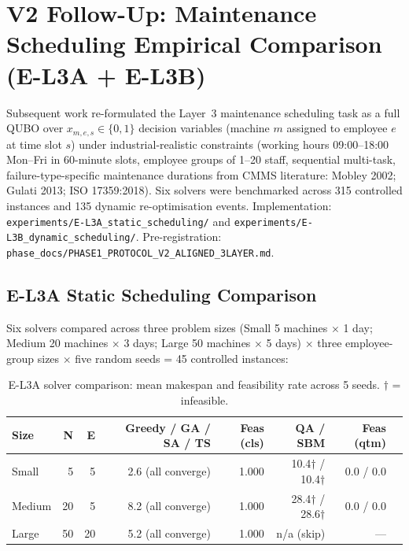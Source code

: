 \section{V2 Follow-Up: Maintenance Scheduling Empirical Comparison (E-L3A + E-L3B)}
\label{sec:v2_scheduling_followup}

Subsequent work re-formulated the Layer~3 maintenance scheduling task as a full QUBO over $x_{m,e,s} \in \{0,1\}$ decision variables (machine $m$ assigned to employee $e$ at time slot $s$) under industrial-realistic constraints (working hours 09:00--18:00 Mon--Fri in 60-minute slots, employee groups of 1--20 staff, sequential multi-task, failure-type-specific maintenance durations from CMMS literature: Mobley 2002; Gulati 2013; ISO 17359:2018). Six solvers were benchmarked across 315 controlled instances and 135 dynamic re-optimisation events. Implementation: \texttt{experiments/E-L3A\_static\_scheduling/} and \texttt{experiments/E-L3B\_dynamic\_scheduling/}. Pre-registration: \texttt{phase\_docs/PHASE1\_PROTOCOL\_V2\_ALIGNED\_3LAYER.md}.

\subsection{E-L3A Static Scheduling Comparison}

Six solvers compared across three problem sizes (Small 5 machines $\times$ 1 day; Medium 20 machines $\times$ 3 days; Large 50 machines $\times$ 5 days) $\times$ three employee-group sizes $\times$ five random seeds = 45 controlled instances:

\begin{table}[htbp]
\centering
\caption{E-L3A solver comparison: mean makespan and feasibility rate across 5 seeds. $\dagger$ = infeasible.}
\label{tab:el3a_comparison}
\begin{tabular}{lrrrrrrr}
\hline
\textbf{Size} & \textbf{N} & \textbf{E} & \textbf{Greedy / GA / SA / TS} & \textbf{Feas (cls)} & \textbf{QA / SBM} & \textbf{Feas (qtm)} \\
\hline
Small  & 5  & 5  & 2.6 (all converge) & 1.000 & 10.4$\dagger$ / 10.4$\dagger$ & 0.0 / 0.0 \\
Medium & 20 & 5  & 8.2 (all converge) & 1.000 & 28.4$\dagger$ / 28.6$\dagger$ & 0.0 / 0.0 \\
Large  & 50 & 20 & 5.2 (all converge) & 1.000 & n/a (skip) & --- \\
\hline
\end{tabular}
\end{table}

